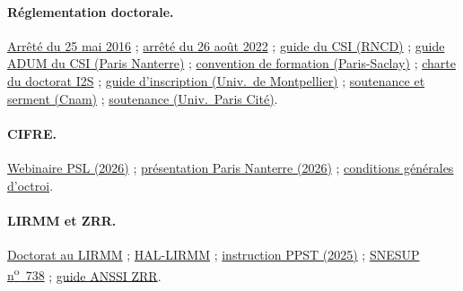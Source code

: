 \documentclass[11pt,a4paper]{article}
\begin{document}
\paragraph{Réglementation doctorale.}
\href{https://www.legifrance.gouv.fr/loda/id/JORFTEXT000032587086}{Arrêté du 25 mai 2016} ;
\href{https://www.legifrance.gouv.fr/jorf/id/JORFTEXT000046228965}{arrêté du 26 août 2022} ;
\href{https://edshal-docs.univ-cotedazur.fr/files/guide_CSI.pdf}{guide du CSI (RNCD)} ;
\href{https://direction-recherche.parisnanterre.fr/medias/fichier/guide-adum-csi_1696864722733-pdf}{guide ADUM du CSI (Paris Nanterre)} ;
\href{https://www.universite-paris-saclay.fr/convention-de-formation-doctorale}{convention de formation (Paris-Saclay)} ;
\href{https://www.imt-mines-ales.fr/sites/default/files/media/2020-09/charte_du_doctorat_i2s.pdf}{charte du doctorat I2S} ;
\href{https://www.umontpellier.fr/wp-content/uploads/2023/06/IDD_guide-inscription_V7.pdf}{guide d'inscription (Univ.\ de Montpellier)} ;
\href{https://www.cnam.fr/recherche-innovation/etudes-doctorales-hdr/soutenances}{soutenance et serment (Cnam)} ;
\href{https://u-paris.fr/doctorat/soutenir-sa-these/}{soutenance (Univ.\ Paris Cité)}.

\paragraph{CIFRE.}
\href{https://static.psl.eu/sites/default/files/2026-07/Webinaire\%20CIFRE\%20COFRA\%2007.04.26.pdf}{Webinaire PSL (2026)} ;
\href{https://ed-lls.parisnanterre.fr/medias/fichier/presentation-cifre-cofra_1776946105660-pdf}{présentation Paris Nanterre (2026)} ;
\href{https://www.universita.corsica/actus/userfiles/file/RECHERCHE/Ecole\%20Doctorale/CIFRE_conditions_octroi_02_2009.pdf}{conditions générales d'octroi}.

\paragraph{LIRMM et ZRR.}
\href{https://www.lirmm.fr/?p=3918}{Doctorat au LIRMM} ;
\href{https://www.lirmm.fr/?p=1097}{HAL-LIRMM} ;
\href{https://armement.defense.gouv.fr/sites/default/files/2025-05/Instruction\%20interminist\%C3\%A9rielle_20250428_PPST.pdf}{instruction PPST (2025)} ;
\href{https://www.snesup.fr/sites/default/files/2025-11/recherche_snesup-ndeg-738pp22-23.pdf}{SNESUP n\textsuperscript{o}~738} ;
\href{https://armement.defense.gouv.fr/sites/default/files/2022-02/guide_ANSSI_protection_numerique_PSTN_juin_2018.pdf}{guide ANSSI ZRR}.
\end{document}
